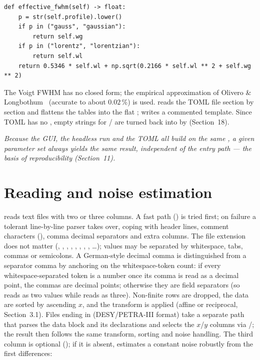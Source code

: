 \documentclass[11pt,a4paper]{article}
\begin{document}
\begin{lstlisting}[style=py]
def effective_fwhm(self) -> float:
    p = str(self.profile).lower()
    if p in ("gauss", "gaussian"):
        return self.wg
    if p in ("lorentz", "lorentzian"):
        return self.wl
    return 0.5346 * self.wl + np.sqrt(0.2166 * self.wl ** 2 + self.wg ** 2)
\end{lstlisting}

\noindent The Voigt FWHM has no closed form; the empirical approximation of
Olivero \& Longbothum~\citep{Olivero1977} (accurate to about $0.02\,\%$) is used.
 reads the TOML file section by section and flattens the
tables into the flat ;  writes a commented
template. Since TOML has no , empty strings for /
are turned back into  by  (Section~18).

\smallskip
\noindent\textit{Because the GUI, the headless run and the TOML all build on the
same , a given parameter set always yields the same result,
independent of the entry path --- the basis of reproducibility (Section~11).}

\section{Reading and noise estimation}
 reads text files with two or three columns. A fast path
() is tried first; on failure a tolerant line-by-line parser
takes over, coping with header lines, comment characters (\code{# ! \%}), comma
decimal separators and extra columns. The file extension does not matter
(, , , , , ,
, , \dots); values may be separated by whitespace, tabs,
commas or semicolons. A German-style decimal comma is distinguished from a
separator comma by anchoring on the whitespace-token count: if every
whitespace-separated token is a number once its comma is read as a decimal point,
the commas are decimal points; otherwise they are field separators (so
 reads as two values while  reads as three). Non-finite rows are dropped, the data are
sorted by ascending $x$, and the transform is applied (affine or reciprocal,
Section~3.1). Files ending in  (DESY/PETRA-III format) take a separate
path that parses the  data block and its  declarations and
selects the $x$/$y$ columns via /; the
result then follows the same transform, sorting and noise handling. The third
column is optional (); if it is absent,
 estimates a constant noise robustly from the first
differences:
\end{document}
